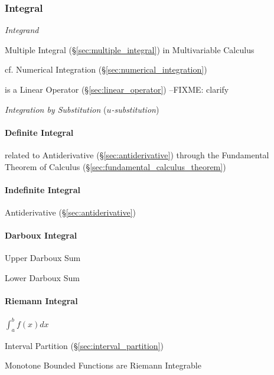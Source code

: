 \subsubsection{Integral}\label{sec:integral}

\emph{Integrand}

\fist Multiple Integral (\S\ref{sec:multiple_integral}) in Multivariable
Calculus

cf. Numerical Integration (\S\ref{sec:numerical_integration})

is a Linear Operator (\S\ref{sec:linear_operator}) --FIXME: clarify

\emph{Integration by Substitution} (\emph{$u$-substitution})



\paragraph{Definite Integral}\label{sec:definite_integral}\hfill

\fist related to Antiderivative (\S\ref{sec:antiderivative}) through the
Fundamental Theorem of Calculus (\S\ref{sec:fundamental_calculus_theorem})



\paragraph{Indefinite Integral}\label{sec:indefinite_integral}\hfill

\fist Antiderivative (\S\ref{sec:antiderivative})



\paragraph{Darboux Integral}\label{sec:darboux_integral}\hfill

Upper Darboux Sum

Lower Darboux Sum



\paragraph{Riemann Integral}\label{sec:riemann_integral}\hfill

$\int_a^b f(x) dx$

Interval Partition (\S\ref{sec:interval_partition})

Monotone Bounded Functions are Riemann Integrable

